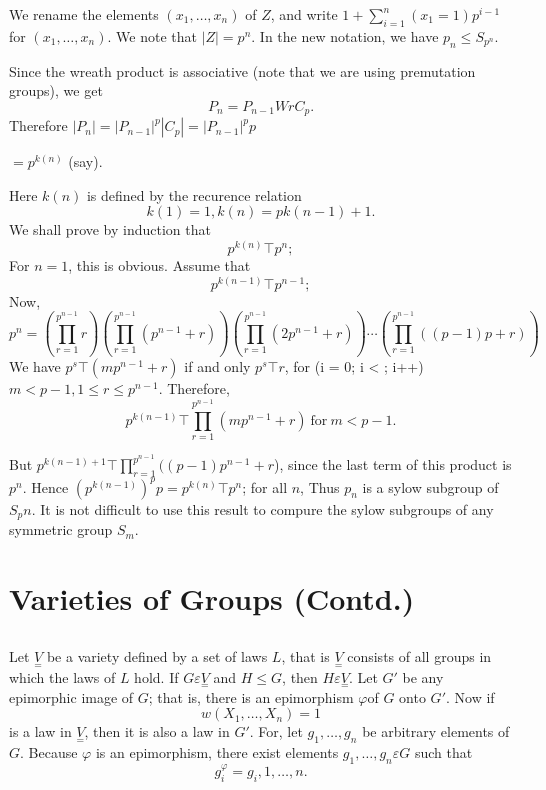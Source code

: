 We rename the elements $(x_1, \ldots, x_n)$ of $Z$, and write $1 +
\sum \limits^n_{i = 1} (x_1 = 1) p^{i-1}$ for $(x_1, \ldots, x_n)$. We
note that $|Z| = p^n$. In the new notation, we have $p_n \le
S_{p^n}$. 

Since the wreath product is associative (note that we are using
premutation groups), we get 
$$
P_n = P_{n-1} W r C_p.
$$
Therefore $|P_n| = | P_{n-1} | ^p | C_p | = | P_{n-1} | ^p p$

\quad \qquad \qquad $= p^{k(n)}$ (say).

Here $k(n)$ is defined by the recurence relation
$$
k(1) = 1, k(n) = p k (n-1) +1.
$$
We shall prove by induction that 
$$
p^{k(n)} \top p^n;
$$
For $n=1$, this is obvious.  Assume that 
$$
p^{k(n-1)} \top p^{n-1};
$$
Now,
$$
p^n = \left( \prod^{p^{n-1}}_{r=1} r \right) \left(
\prod^{p^{n-1}}_{r=1}(p^{n-1}+r) \right) \left( \prod^{p^{n-1}}_{r=1}(2
p^{n-1} + r) \right) \cdots \left( \prod^{p^{n-1}}_{r=1}((p-1) p+r)
\right) 
$$
We have $p^s \top (mp^{n-1} + r)$ if and only $p^s \top r$, for (i =
0; i < ; i++) $m < p-1, 1 \le r \le p^{n-1}$. Therefore, 
$$
p^{k(n-1)} \top  \prod^{p^{n-1}}_{r=1} (m p^{n-1} + r) ~\text{for}~ m < p - 1.
$$

But $p^{k(n-1)+1} \top  \prod^{p^{n-1}}_{r=1} ((p-1) p^{n-1} + r$),
since the last term of this product is $p^n$. Hence $(p^{k(n-1)})^p p
= p^{k(n)} \top p^n$; for all $n$, Thus $p_n$ is a sylow subgroup of
$S_p n$. It is not difficult to use this result to compure the sylow
subgroups of any symmetric group $S_m$.  

\chapter{Varieties of Groups (Contd.)} %

\section{}%

Let $\underset{=}V$ be a variety defined by a set of laws $L$, that is
$\underset{=}V$ consists of all groups in which the laws of $L$
hold. If $G \varepsilon \underset{=}V$ and $H \le G$, then $H
\varepsilon \underset{=}V$. Let $G'$ be any epimorphic image of $G$;
that is, there is an epimorphism $\varphi $of $G$ onto $G'$. Now if  
$$
w(X_1,  \ldots,  X_n) = 1
$$
is a law in $\underset{=}V$, then it is also a law in $G'$. For, let
$g_1, \ldots,  g_n$ be arbitrary elements of $G$. Because $\varphi$ is
an epimorphism, there exist elements $g_1, \ldots,  g_n \varepsilon G$
such that  
$$
g^\varphi_i = g_i,  1, \ldots, n.
$$


